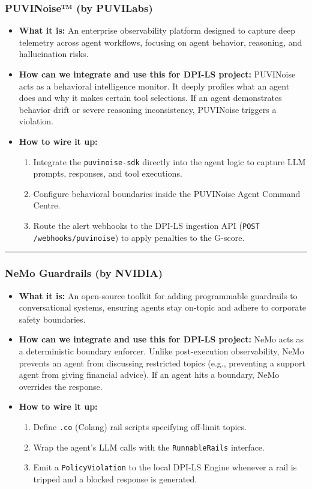 \documentclass[11pt,a4paper]{article}
\begin{document}
\subsubsection*{PUVINoise™ (by PUVILabs)}
\begin{itemize}
    \item \textbf{What it is:} An enterprise observability platform designed to capture deep telemetry across agent workflows, focusing on agent behavior, reasoning, and hallucination risks.
    \item \textbf{How can we integrate and use this for DPI-LS project:} PUVINoise acts as a behavioral intelligence monitor. It deeply profiles what an agent does and why it makes certain tool selections. If an agent demonstrates behavior drift or severe reasoning inconsistency, PUVINoise triggers a violation.
    \item \textbf{How to wire it up:}
    \begin{enumerate}
        \item Integrate the \texttt{puvinoise-sdk} directly into the agent logic to capture LLM prompts, responses, and tool executions.
        \item Configure behavioral boundaries inside the PUVINoise Agent Command Centre.
        \item Route the alert webhooks to the DPI-LS ingestion API (\texttt{POST /webhooks/puvinoise}) to apply penalties to the G-score.
    \end{enumerate}
\end{itemize}

\vspace{0.2cm}\hrule\vspace{0.2cm}

\subsubsection*{NeMo Guardrails (by NVIDIA)}
\begin{itemize}
    \item \textbf{What it is:} An open-source toolkit for adding programmable guardrails to conversational systems, ensuring agents stay on-topic and adhere to corporate safety boundaries.
    \item \textbf{How can we integrate and use this for DPI-LS project:} NeMo acts as a deterministic boundary enforcer. Unlike post-execution observability, NeMo prevents an agent from discussing restricted topics (e.g., preventing a support agent from giving financial advice). If an agent hits a boundary, NeMo overrides the response.
    \item \textbf{How to wire it up:}
    \begin{enumerate}
        \item Define \texttt{.co} (Colang) rail scripts specifying off-limit topics.
        \item Wrap the agent's LLM calls with the \texttt{RunnableRails} interface.
        \item Emit a \texttt{PolicyViolation} to the local DPI-LS Engine whenever a rail is tripped and a blocked response is generated.
    \end{enumerate}
\end{itemize}
\end{document}
